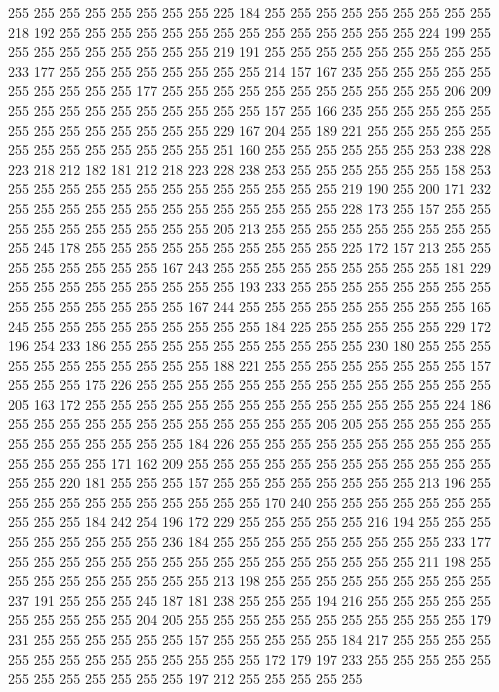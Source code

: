 255 255 255 255 255 255 255 255 225 184 255 255 255 255 255 255 255 255 255 218
192 255 255 255 255 255 255 255 255 255 255 255 255 255 255 224 199 255 255 255
255 255 255 255 255 255 219 191 255 255 255 255 255 255 255 255 255 233 177 255
255 255 255 255 255 255 255 214 157 167 235 255 255 255 255 255 255 255 255 255
255 177 255 255 255 255 255 255 255 255 255 255 255 206 209 255 255 255 255 255
255 255 255 255 255 157 255 166 235 255 255 255 255 255 255 255 255 255 255 255
255 255 229 167 204 255 189 221 255 255 255 255 255 255 255 255 255 255 255 255
255 251 160 255 255 255 255 255 255 253 238 228 223 218 212 182 181 212 218 223
228 238 253 255 255 255 255 255 255 158 253 255 255 255 255 255 255 255 255 255
255 255 255 255 219 190 255 200 171 232 255 255 255 255 255 255 255 255 255 255
255 255 255 228 173 255 157 255 255 255 255 255 255 255 255 255 255 205 213 255
255 255 255 255 255 255 255 255 255 245 178 255 255 255 255 255 255 255 255 255
255 225 172 157 213 255 255 255 255 255 255 255 255 167 243 255 255 255 255 255
255 255 255 255 181 229 255 255 255 255 255 255 255 255 255 193 233 255 255 255
255 255 255 255 255 255 255 255 255 255 255 255 167 244 255 255 255 255 255 255
255 255 255 165 245 255 255 255 255 255 255 255 255 255 184 225 255 255 255 255
255 229 172 196 254 233 186 255 255 255 255 255 255 255 255 255 255 230 180 255
255 255 255 255 255 255 255 255 255 255 188 221 255 255 255 255 255 255 255 255
157 255 255 255 175 226 255 255 255 255 255 255 255 255 255 255 255 255 255 255
205 163 172 255 255 255 255 255 255 255 255 255 255 255 255 255 255 224 186 255
255 255 255 255 255 255 255 255 255 255 255 205 205 255 255 255 255 255 255 255
255 255 255 255 255 184 226 255 255 255 255 255 255 255 255 255 255 255 255 255
255 171 162 209 255 255 255 255 255 255 255 255 255 255 255 255 255 255 220 181
255 255 255 157 255 255 255 255 255 255 255 255 213 196 255 255 255 255 255 255
255 255 255 255 255 170 240 255 255 255 255 255 255 255 255 255 255 184 242 254
196 172 229 255 255 255 255 255 216 194 255 255 255 255 255 255 255 255 255 236
184 255 255 255 255 255 255 255 255 255 233 177 255 255 255 255 255 255 255 255
255 255 255 255 255 255 255 255 211 198 255 255 255 255 255 255 255 255 255 213
198 255 255 255 255 255 255 255 255 255 237 191 255 255 255 245 187 181 238 255
255 255 194 216 255 255 255 255 255 255 255 255 255 255 204 205 255 255 255 255
255 255 255 255 255 255 255 179 231 255 255 255 255 255 255 157 255 255 255 255
255 184 217 255 255 255 255 255 255 255 255 255 255 255 255 255 255 172 179 197
233 255 255 255 255 255 255 255 255 255 255 255 255 197 212 255 255 255 255 255
